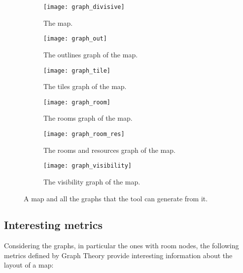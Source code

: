 \begin{figure}[]
	\centering
  	\begin{subfigure}[t]{0.45\linewidth}
		\texttt{[image: graph\_divisive]}
     		\caption{The map.}
     		\label{img:graph_divisive}
 	\end{subfigure}
  	\begin{subfigure}[t]{0.45\linewidth}
    		\texttt{[image: graph\_out]}
    		\caption{The outlines graph of the map.}
     		\label{img:graph_out}
  	\end{subfigure}
  	\begin{subfigure}[t]{0.45\linewidth}
    		\texttt{[image: graph\_tile]}
    		\caption{The tiles graph of the map.}
     		\label{img:graph_tile}
  	\end{subfigure}
  	\begin{subfigure}[t]{0.45\linewidth}
    		\texttt{[image: graph\_room]}
    		\caption{The rooms graph of the map.}
     		\label{img:graph_room}
 	\end{subfigure}
  	\begin{subfigure}[t]{0.45\linewidth}
    		\texttt{[image: graph\_room\_res]}
    		\caption{The rooms and resources graph of the map.}
     		\label{img:graph_room_res}
  	\end{subfigure}
  	\begin{subfigure}[t]{0.45\linewidth}
    		\texttt{[image: graph\_visibility]}
    		\caption{The visibility graph of the map.}
     		\label{img:graph_visibility}
  	\end{subfigure}	
	\caption{A map and all the graphs that the tool can generate from it.}
\end{figure}

\subsection{Interesting metrics}

Considering the graphs, in particular the ones with room nodes, the following metrics defined by Graph Theory provide interesting information about the layout of a map:

